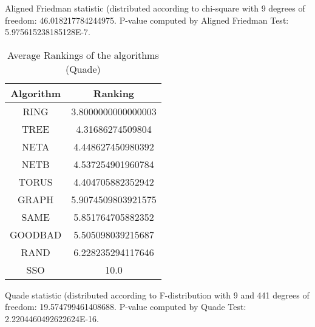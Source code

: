 \documentclass[a4paper,10pt]{article}
\begin{document}
\begin{landscape}
Aligned Friedman statistic (distributed according to chi-square with 9 degrees of freedom: 46.018217784244975. 
P-value computed by Aligned Friedman Test: 5.975615238185128E-7.\newline


\newpage

\begin{table}[!htp]
\centering
\caption{Average Rankings of the algorithms (Quade)
}\begin{tabular}{c|c}
Algorithm&Ranking\\
\hline
 RING&3.8000000000000003\\
 TREE&4.31686274509804\\
 NETA&4.448627450980392\\
 NETB&4.537254901960784\\
 TORUS&4.404705882352942\\
 GRAPH&5.9074509803921575\\
 SAME&5.851764705882352\\
 GOODBAD&5.505098039215687\\
 RAND&6.228235294117646\\
 SSO&10.0\\
\end{tabular}
\end{table}
Quade statistic (distributed according to F-distribution with 9 and 441 degrees of freedom: 19.574799461408688. 
P-value computed by Quade Test: 2.2204460492622624E-16.\newline


\newpage


\end{landscape}
\end{document}
